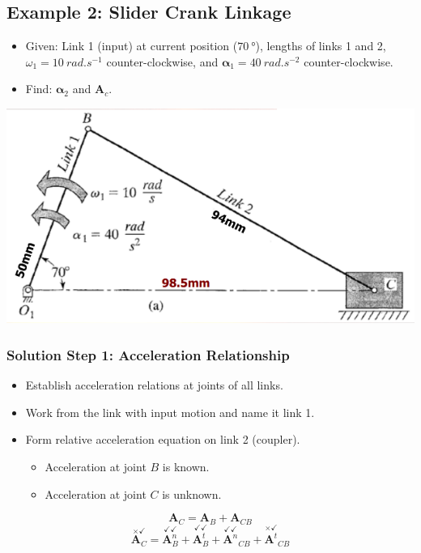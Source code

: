 \documentclass[11pt]{article}
\begin{document}
 \newpage
\subsection{Example 2: Slider Crank Linkage}
\label{sec:orgf02dd07}
\begin{itemize}
\item Given: Link 1 (input) at current position (\(\qty{70}{\degree}\)), lengths of links 1 and 2, \(\omega_1 = \qty{10}{rad.s^{-1}}\) counter-clockwise, and \(\boldsymbol{\alpha}_1 = \qty{40}{rad.s^{-2}}\) counter-clockwise.
\item Find: \(\boldsymbol{\alpha}_2\) and \(\boldsymbol{A}_c\).
\end{itemize}

\begin{center}
\includegraphics[width=.9\linewidth]{./images/slider-crank-linkage-graphical-acceleration-analysis-example-2.png}
\end{center}

 \newpage
\subsubsection{Solution Step 1: Acceleration Relationship}
\label{sec:org063ca84}
\begin{itemize}
\item Establish acceleration relations at joints of all links.
\item Work from the link with input motion and name it link 1.
\item Form relative acceleration equation on link 2 (coupler).
\begin{itemize}
\item Acceleration at joint \(B\) is known.
\item Acceleration at joint \(C\) is unknown.
\end{itemize}
\end{itemize}
\[\boldsymbol{A}_C = \boldsymbol{A}_B + \boldsymbol{A}_{CB}\]
\[\overset{\times \checkmark}{\boldsymbol{A}_C} = \overset{\checkmark \checkmark}{\boldsymbol{A}_B^n} + \overset{\checkmark \checkmark}{\boldsymbol{A}_B^t} + \overset{\checkmark \checkmark}{\boldsymbol{A}^n}_{CB} + \overset{\times \checkmark}{\boldsymbol{A}^t}_{CB}\]
\end{document}
